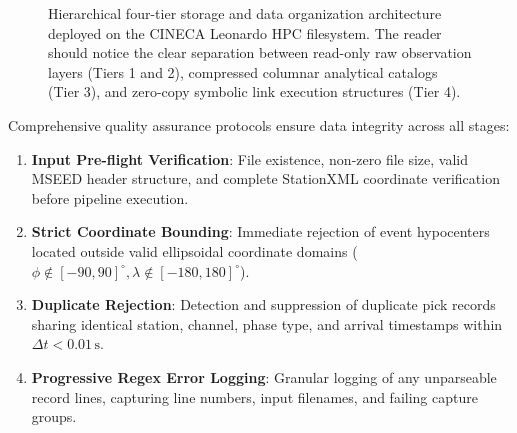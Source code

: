 \begin{figure}[htbp]
  \centering
  \caption{Hierarchical four-tier storage and data organization architecture deployed on the CINECA Leonardo HPC filesystem. The reader should notice the clear separation between read-only raw observation layers (Tiers 1 and 2), compressed columnar analytical catalogs (Tier 3), and zero-copy symbolic link execution structures (Tier 4).}
  \label{fig:storage_architecture}
\end{figure}

Comprehensive quality assurance protocols ensure data integrity across all stages:
\begin{enumerate}
  \item \textbf{Input Pre-flight Verification}: File existence, non-zero file size, valid MSEED header structure, and complete StationXML coordinate verification before pipeline execution.
  \item \textbf{Strict Coordinate Bounding}: Immediate rejection of event hypocenters located outside valid ellipsoidal coordinate domains ($\phi \notin [-90, 90]^\circ, \lambda \notin [-180, 180]^\circ$).
  \item \textbf{Duplicate Rejection}: Detection and suppression of duplicate pick records sharing identical station, channel, phase type, and arrival timestamps within $\Delta t < 0.01\,\mathrm{s}$.
  \item \textbf{Progressive Regex Error Logging}: Granular logging of any unparseable record lines, capturing line numbers, input filenames, and failing capture groups.
\end{enumerate}
